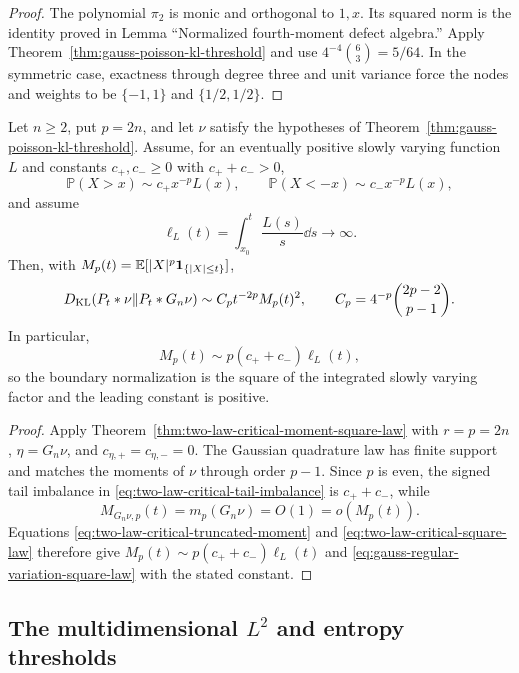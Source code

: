 \begin{proof}
The polynomial \(\pi_2\) is monic and orthogonal to \(1,x\).  Its squared
norm is the identity proved in Lemma ``Normalized
fourth-moment defect algebra.''  Apply
Theorem~\ref{thm:gauss-poisson-kl-threshold} and use
\(4^{-4}\binom63=5/64\).  In the symmetric case, exactness through degree
three and unit variance force the nodes and weights to be
\(\{-1,1\}\) and \(\{1/2,1/2\}\).
\end{proof}

\begin{theorem}
\label{thm:gauss-regular-variation-square-law}
Let \(n\ge2\), put \(p=2n\), and let \(\nu\) satisfy the hypotheses of
Theorem~\ref{thm:gauss-poisson-kl-threshold}.  Assume, for an eventually
positive slowly varying function \(L\) and constants \(c_+,c_-\ge0\) with
\(c_++c_->0\),
\[
 \mathbb P(X>x)\sim c_+x^{-p}L(x),\qquad
 \mathbb P(X<-x)\sim c_-x^{-p}L(x),
\]
and assume
\[
 \ell_L(t)=\int_{x_0}^t\frac{L(s)}s\dd s\longrightarrow\infty.
\]
Then, with
\(M_p(t)=\mathbb{E}[|X|^p\mathbf1_{\{|X|\le t\}}]\),
\begin{equation}\label{eq:gauss-regular-variation-square-law}
 D_{\rm KL}(P_t*\nu\|P_t*G_n\nu)
 \sim C_p t^{-2p}M_p(t)^2,
 \qquad C_p=4^{-p}\binom{2p-2}{p-1}.
\end{equation}
In particular,
\[
 M_p(t)\sim p(c_++c_-)\ell_L(t),
\]
so the boundary normalization is the square of the integrated slowly
varying factor and the leading constant is positive.
\end{theorem}

\begin{proof}
Apply Theorem~\ref{thm:two-law-critical-moment-square-law} with
\(r=p=2n\), \(\eta=G_n\nu\), and
\(c_{\eta,+}=c_{\eta,-}=0\).  The Gaussian quadrature law has finite support
and matches the moments of \(\nu\) through order \(p-1\).  Since \(p\) is
even, the signed tail imbalance in
\eqref{eq:two-law-critical-tail-imbalance} is \(c_++c_-\), while
\[
 M_{G_n\nu,p}(t)=m_p(G_n\nu)=O(1)=o(M_p(t)).
\]
Equations \eqref{eq:two-law-critical-truncated-moment} and
\eqref{eq:two-law-critical-square-law} therefore give
\(M_p(t)\sim p(c_++c_-)\ell_L(t)\) and
\eqref{eq:gauss-regular-variation-square-law} with the stated constant.
\end{proof}

\subsection{The multidimensional \texorpdfstring{\(L^2\)}{L2} and entropy
thresholds}

